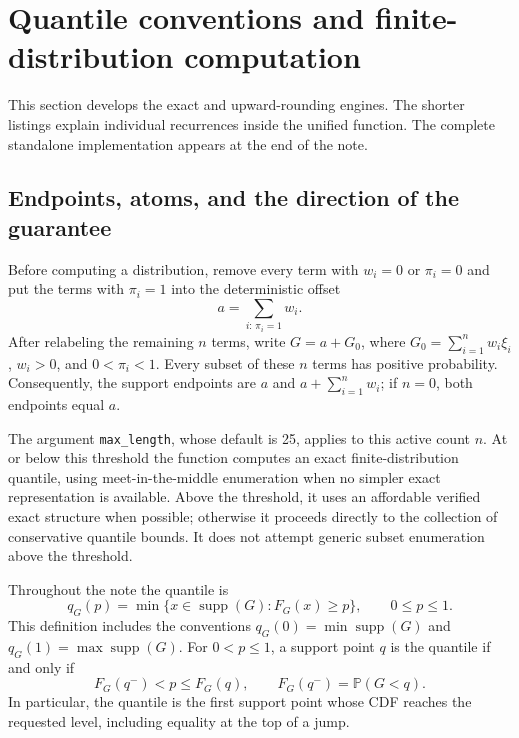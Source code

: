 \documentclass[11pt,letterpaper]{article}
\numberwithin{equation}{section}
\theoremstyle{definition}
\theoremstyle{remark}
\begin{document}
\section{Quantile conventions and finite-distribution computation}
\label{sec:exact-grid}

This section develops the exact and upward-rounding engines. The shorter
listings explain individual recurrences inside the unified function.
The complete standalone implementation appears at the end of the note.

\subsection{Endpoints, atoms, and the direction of the guarantee}

Before computing a distribution, remove every term with $w_i=0$ or
$\pi_i=0$ and put the terms with $\pi_i=1$ into the deterministic offset
\[
 a=\sum_{i:\,\pi_i=1}w_i.
\]
After relabeling the remaining $n$ terms, write
$G=a+G_0$, where $G_0=\sum_{i=1}^n w_i\xi_i$, $w_i>0$, and
$0<\pi_i<1$.  Every subset of these $n$ terms has positive probability.
Consequently, the support endpoints are $a$ and $a+\sum_{i=1}^n w_i$;
if $n=0$, both endpoints equal $a$.

The argument \texttt{max\_length}, whose default is 25, applies to this
active count $n$. At or below this threshold the function computes an
exact finite-distribution quantile, using meet-in-the-middle enumeration
when no simpler exact representation is available. Above the threshold,
it uses an affordable verified exact structure when possible; otherwise
it proceeds directly to the collection of conservative quantile bounds.
It does not attempt generic subset enumeration above the threshold.

Throughout the note the quantile is
\begin{equation}
 q_G(p)=\min\{x\in\operatorname{supp}(G):F_G(x)\ge p\},
 \qquad 0\le p\le1.
 \label{eq:ordinary-quantile}
\end{equation}
This definition includes the conventions $q_G(0)=\min\operatorname{supp}(G)$
and $q_G(1)=\max\operatorname{supp}(G)$.  For $0<p\le1$, a support point
$q$ is the quantile if and only if
\begin{equation}
 F_G(q^-)<p\le F_G(q),
 \qquad F_G(q^-)=\mathbb P(G<q).
 \label{eq:quantile-jump-check}
\end{equation}
In particular, the quantile is the first support point whose CDF reaches
the requested level, including equality at the top of a jump.
\end{document}
